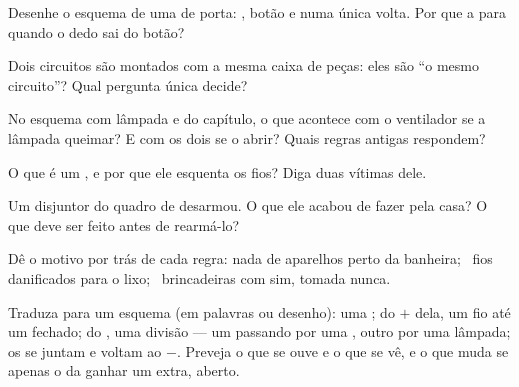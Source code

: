 \begin{exercise}[$\star$]\label{exo:g6:circuits-and-safety:3}
Desenhe o esquema de uma  de porta: , botão e
 numa única volta. Por que a  para quando o dedo
sai do botão?
\end{exercise}

\begin{exercise}[$\star$]\label{exo:g6:circuits-and-safety:4}
Dois circuitos são montados com a mesma caixa de peças: eles são ``o
mesmo circuito''? Qual pergunta única decide?
\end{exercise}

\begin{exercise}[$\star$]\label{exo:g6:circuits-and-safety:5}
No esquema com lâmpada e  do capítulo, o que acontece com o
ventilador se a lâmpada queimar? E com os dois se o 
abrir? Quais regras antigas respondem?
\end{exercise}

\begin{exercise}[$\star$]\label{exo:g6:circuits-and-safety:6}
O que é um , e por que ele esquenta os fios? Diga duas
vítimas dele.
\end{exercise}

\begin{exercise}[$\star$]\label{exo:g6:circuits-and-safety:7}
Um disjuntor do quadro de  desarmou. O que ele acabou de fazer
pela casa? O que deve ser feito antes de rearmá-lo?
\end{exercise}

\begin{exercise}[$\star$]\label{exo:g6:circuits-and-safety:8}
Dê o motivo por trás de cada regra: nada de aparelhos perto da
banheira; \ fios danificados para o lixo; \ brincadeiras com 
sim, tomada nunca.
\end{exercise}

\begin{exercise}[$\star\star$]\label{exo:g6:circuits-and-safety:9}
Traduza para um esquema (em palavras ou desenho): uma ; do $+$
dela, um fio até um  fechado; do , uma divisão
--- um  passando por uma , outro por uma lâmpada; os
 se juntam e voltam ao $-$. Preveja o que se ouve e o que se vê,
e o que muda se apenas o  da  ganhar um 
extra, aberto.
\end{exercise}

